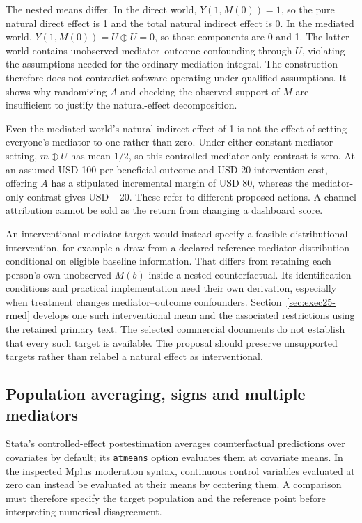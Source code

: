 The nested means differ. In the direct world, $Y(1,M(0))=1$, so the pure natural direct effect is 1 and the total natural indirect effect is 0. In the mediated world,
$Y(1,M(0))=U\oplus U=0$, so those components are 0 and 1. The latter world contains unobserved mediator--outcome confounding through $U$, violating the assumptions needed for the ordinary mediation integral. The construction therefore does not contradict software operating under qualified assumptions. It shows why randomizing $A$ and checking the observed support of $M$ are insufficient to justify the natural-effect decomposition.

Even the mediated world's natural indirect effect of 1 is not the effect of setting everyone's mediator to one rather than zero. Under either constant mediator setting, $m\oplus U$ has mean $1/2$, so this controlled mediator-only contrast is zero. At an assumed USD 100 per beneficial outcome and USD 20 intervention cost, offering $A$ has a stipulated incremental margin of USD 80, whereas the mediator-only contrast gives USD $-20$. These refer to different proposed actions. A channel attribution cannot be sold as the return from changing a dashboard score.

An interventional mediator target would instead specify a feasible distributional intervention, for example a draw from a declared reference mediator distribution conditional on eligible baseline information. That differs from retaining each person's own unobserved $M(b)$ inside a nested counterfactual. Its identification conditions and practical implementation need their own derivation, especially when treatment changes mediator--outcome confounders. Section~\ref{sec:exec25-rmed} develops one such interventional mean and the associated restrictions using the retained primary text. The selected commercial documents do not establish that every such target is available. The proposal should preserve unsupported targets rather than relabel a natural effect as interventional.

\subsection{Population averaging, signs and multiple mediators}
\label{exec20:med-population}
Stata's controlled-effect postestimation averages counterfactual predictions over covariates by default; its \texttt{atmeans} option evaluates them at covariate means. In the inspected Mplus moderation syntax, continuous control variables evaluated at zero can instead be evaluated at their means by centering them. A comparison must therefore specify the target population and the reference point before interpreting numerical disagreement.~\citep{exec20_med_stata_post,exec20_med_mplus_ch17}

